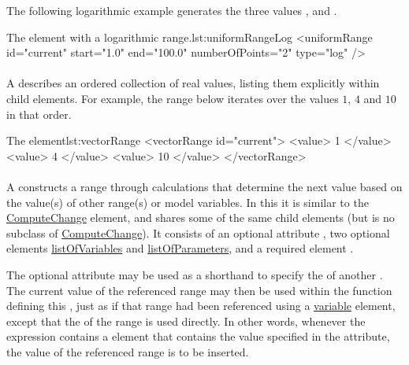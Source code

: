 The following logarithmic example generates the three values ,  and .
\begin{myXmlLst}{The  element with a logarithmic range.}{lst:uniformRangeLog}
    <uniformRange id="current" start="1.0" end="100.0" numberOfPoints="2" type="log" />
\end{myXmlLst}

\paragraph{}
\label{class:vectorRange}


A  describes an ordered collection of real values, listing them explicitly within child  elements.
For example, the range below iterates over the values $1$, $4$ and $10$ in that order.
\begin{myXmlLst}{The  element}{lst:vectorRange}
    <vectorRange id="current"> 
        <value> 1 </value> 
        <value> 4 </value> 
        <value> 10 </value> 
    </vectorRange> 
\end{myXmlLst}

\paragraph{}
\label{class:functionalRange}


A  constructs a range through calculations that determine the next value based on the value(s) of other range(s) or model variables. In this it is similar to the \hyperref[class:computeChange]{ComputeChange} element, and shares some of the same child elements (but is no subclass of \hyperref[class:computeChange]{ComputeChange}).
It consists of an optional attribute , two optional elements \hyperref[sec:listOfVariables]{listOfVariables} and \hyperref[sec:listOfParameters]{listOfParameters}, and a required element .

The optional attribute  may be used as a shorthand to specify the  of another . The current value of the referenced range may then be used within the function defining this , just as if that range had been referenced using a \hyperref[class:variable]{variable} element, except that the  of the range is used directly.
In other words, whenever the expression contains a  element that contains the value specified in the  attribute, the value of the referenced range is to be inserted.

